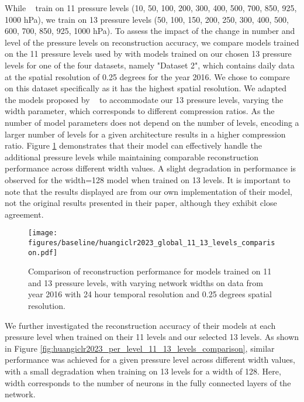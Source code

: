 While ~\cite{huang2022compressing} train on 11 pressure levels (10, 50, 100, 200, 300, 400, 500, 700, 850, 925, 1000 hPa), we train on 13 pressure levels (50, 100, 150, 200, 250, 300, 400, 500, 600, 700, 850, 925, 1000 hPa).
To assess the impact of the change in number and level of the pressure levels on reconstruction accuracy, we compare models trained on the 11 pressure  levels used by \cite{huang2022compressing} with models trained on our chosen 13 pressure levels for one of the four datasets, namely "Dataset 2", which contains daily data at the spatial resolution of 0.25 degrees for the year 2016.
We chose to compare on this dataset specifically as it has the highest spatial resolution.
We adapted the models proposed by 
~\cite{huang2022compressing} to accommodate our 13 pressure levels, varying the width parameter, which corresponds to different compression ratios.
As the number of model parameters does not depend on the number of levels, encoding a larger number of levels for a given architecture results in a higher compression ratio. 
Figure \ref{fig:huangiclr2023_global_11_13_levels_comparison} demonstrates that their model can effectively handle the additional pressure levels while maintaining comparable reconstruction performance across different width values. A slight degradation in performance is observed for the width=128 model when trained on 13 levels. It is important to note that the results displayed are from our own implementation of their model, not the original results presented in their paper, although they exhibit close agreement.

\begin{figure}[h]
\centering
\texttt{[image: figures/baseline/huangiclr2023\_global\_11\_13\_levels\_comparison.pdf]}
\caption{Comparison of reconstruction performance for models trained on 11 and 13 pressure levels, with varying network widths on data from year 2016 with 24 hour temporal resolution and 0.25 degrees spatial resolution.}
\label{fig:huangiclr2023_global_11_13_levels_comparison}
\end{figure}

We further investigated the reconstruction accuracy of their models at each pressure level when trained on their 11 levels and our selected 13 levels. As shown in Figure \ref{fig:huangiclr2023_per_level_11_13_levels_comparison}, similar performance was achieved for a given pressure level across different width values, with a small degradation when training on 13 levels for a width of 128. Here, width corresponds to the number of neurons in the fully connected layers of the network.



